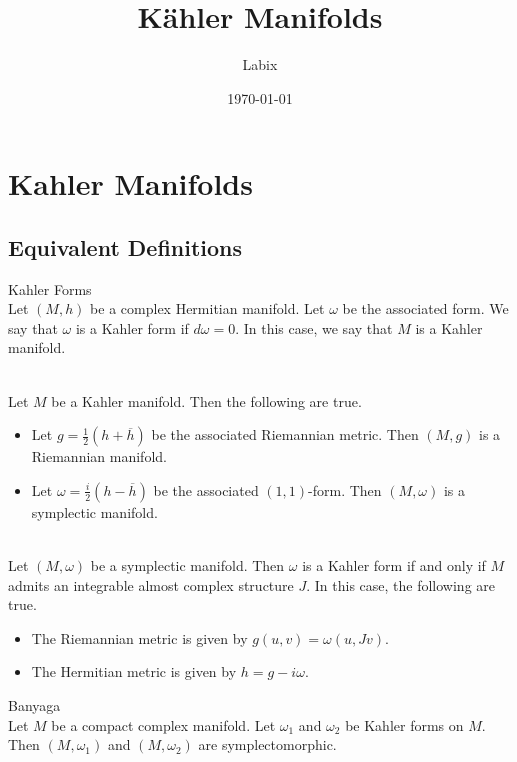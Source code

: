 \documentclass[a4paper]{article}
\title{Kähler Manifolds}
\author{Labix}
\date{\today}
\begin{document}
\maketitle
\begin{abstract}
\end{abstract}
\pagebreak
\tableofcontents

\pagebreak
\section{Kahler Manifolds}
\subsection{Equivalent Definitions}
\begin{defn}{Kahler Forms}{}\\
Let $(M,h)$ be a complex Hermitian manifold. Let $\omega$ be the associated form. We say that $\omega$ is a Kahler form if $d\omega=0$. In this case, we say that $M$ is a Kahler manifold. 
\end{defn}

\begin{lmm}{}{}\\
Let $M$ be a Kahler manifold. Then the following are true. 
\begin{itemize}
\item Let $g=\frac{1}{2}(h+\overline{h})$ be the associated Riemannian metric. Then $(M,g)$ is a Riemannian manifold. 
\item Let $\omega=\frac{i}{2}(h-\overline{h})$ be the associated $(1,1)$-form. Then $(M,\omega)$ is a symplectic manifold. 
\end{itemize}
\end{lmm}

\begin{prp}{}{}\\
Let $(M,\omega)$ be a symplectic manifold. Then $\omega$ is a Kahler form if and only if $M$ admits an integrable almost complex structure $J$. In this case, the following are true. 
\begin{itemize}
\item The Riemannian metric is given by $g(u,v)=\omega(u,Jv)$. 
\item The Hermitian metric is given by $h=g-i\omega$. 
\end{itemize}
\end{prp}

\begin{thm}{Banyaga}{}\\
Let $M$ be a compact complex manifold. Let $\omega_1$ and $\omega_2$ be Kahler forms on $M$. Then $(M,\omega_1)$ and $(M,\omega_2)$ are symplectomorphic. 
\end{thm}
\end{document}
